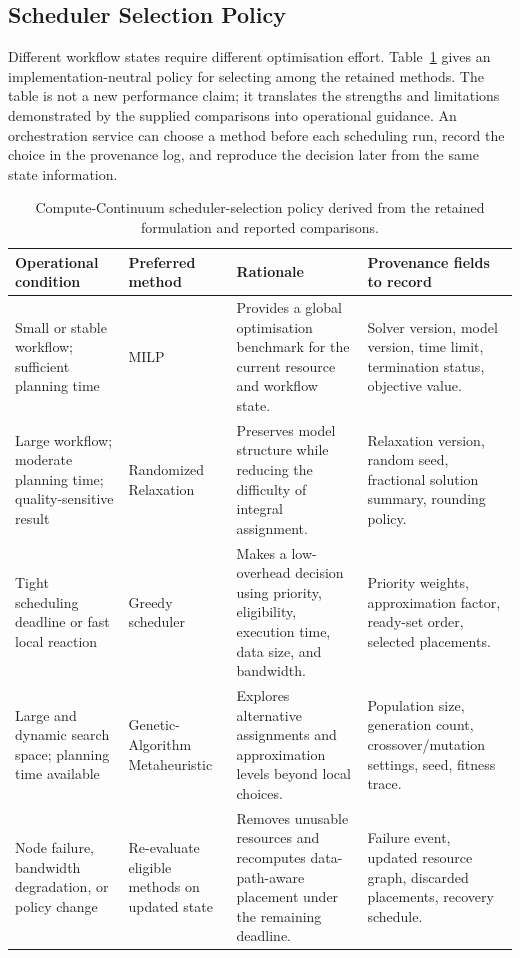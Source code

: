 \subsection{Scheduler Selection Policy}

Different workflow states require different optimisation effort. Table~\ref{tab:orchestration_policy} gives an implementation-neutral policy for selecting among the retained methods. The table is not a new performance claim; it translates the strengths and limitations demonstrated by the supplied comparisons into operational guidance. An orchestration service can choose a method before each scheduling run, record the choice in the provenance log, and reproduce the decision later from the same state information.

\begin{table}[t]
\centering
\caption{Compute-Continuum scheduler-selection policy derived from the retained formulation and reported comparisons.}
\label{tab:orchestration_policy}
\small
\begin{tabular}{p{}p{}p{}p{}}
\toprule
\textbf{Operational condition} & \textbf{Preferred method} & \textbf{Rationale} & \textbf{Provenance fields to record} \\
\midrule
Small or stable workflow; sufficient planning time & MILP & Provides a global optimisation benchmark for the current resource and workflow state. & Solver version, model version, time limit, termination status, objective value. \\
\addlinespace
Large workflow; moderate planning time; quality-sensitive result & Randomized Relaxation & Preserves model structure while reducing the difficulty of integral assignment. & Relaxation version, random seed, fractional solution summary, rounding policy. \\
\addlinespace
Tight scheduling deadline or fast local reaction & Greedy scheduler & Makes a low-overhead decision using priority, eligibility, execution time, data size, and bandwidth. & Priority weights, approximation factor, ready-set order, selected placements. \\
\addlinespace
Large and dynamic search space; planning time available & Genetic-Algorithm Metaheuristic & Explores alternative assignments and approximation levels beyond local choices. & Population size, generation count, crossover/mutation settings, seed, fitness trace. \\
\addlinespace
Node failure, bandwidth degradation, or policy change & Re-evaluate eligible methods on updated state & Removes unusable resources and recomputes data-path-aware placement under the remaining deadline. & Failure event, updated resource graph, discarded placements, recovery schedule. \\
\bottomrule
\end{tabular}
\end{table}

